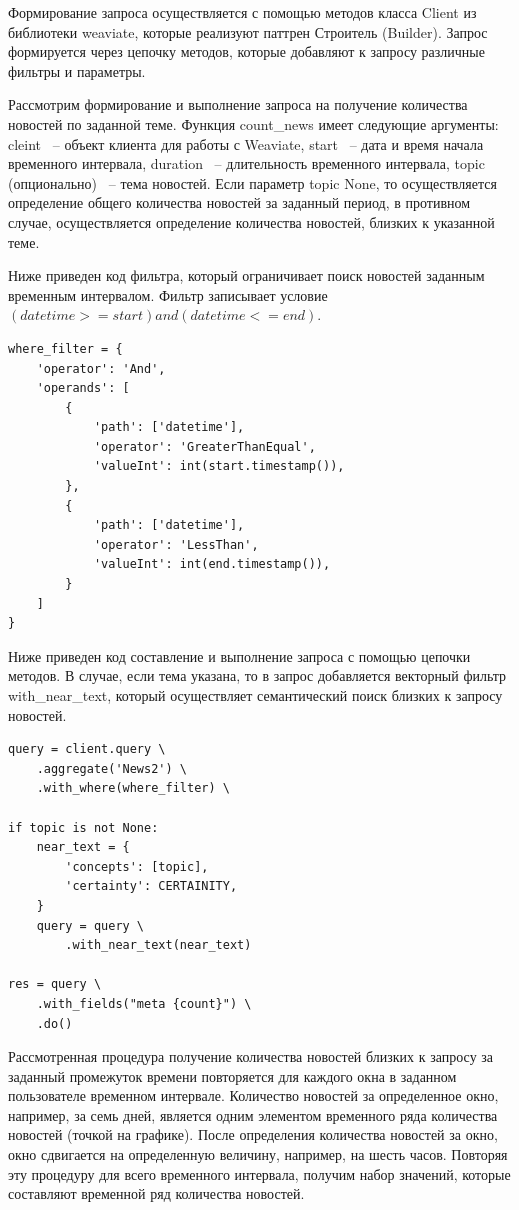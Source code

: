 Формирование запроса осуществляется с помощью методов класса Client из библиотеки weaviate, которые реализуют паттрен Строитель (Builder). Запрос формируется через цепочку методов, которые добавляют к запросу различные фильтры и параметры.

Рассмотрим формирование и выполнение запроса на получение количества новостей по заданной теме. Функция count\_news имеет следующие аргументы: cleint ~-- объект клиента для работы с Weaviate, start ~-- дата и время начала временного интервала, duration ~-- длительность временного интервала, topic (опционально) ~-- тема новостей. Если параметр topic None, то осуществляется определение общего количества новостей за заданный период, в противном случае, осуществляется определение количества новостей, близких к указанной теме.

Ниже приведен код фильтра, который ограничивает поиск новостей заданным временным интервалом. Фильтр записывает условие $(datetime >= start) and (datetime <= end)$.

\begin{lstlisting}
where_filter = {
    'operator': 'And',
    'operands': [
        {
            'path': ['datetime'],
            'operator': 'GreaterThanEqual',
            'valueInt': int(start.timestamp()),
        },
        {
            'path': ['datetime'],
            'operator': 'LessThan',
            'valueInt': int(end.timestamp()),
        }
    ]
}
\end{lstlisting}

Ниже приведен код составление и выполнение запроса с помощью цепочки методов. В случае, если тема указана, то в запрос добавляется векторный фильтр with\_near\_text, который осуществляет семантический поиск близких к запросу новостей.

\begin{lstlisting}
query = client.query \
    .aggregate('News2') \
    .with_where(where_filter) \

if topic is not None:
    near_text = {
        'concepts': [topic],
        'certainty': CERTAINITY,
    }
    query = query \
        .with_near_text(near_text)

res = query \
    .with_fields("meta {count}") \
    .do()
\end{lstlisting}

Рассмотренная процедура получение количества новостей близких к запросу за заданный промежуток времени повторяется для каждого окна в заданном пользователе временном интервале. Количество новостей за определенное окно, например, за семь дней, является одним элементом временного ряда количества новостей (точкой на графике). После определения количества новостей за окно, окно сдвигается на определенную величину, например, на шесть часов. Повторяя эту процедуру для всего временного интервала, получим набор значений, которые составляют временной ряд количества новостей.

